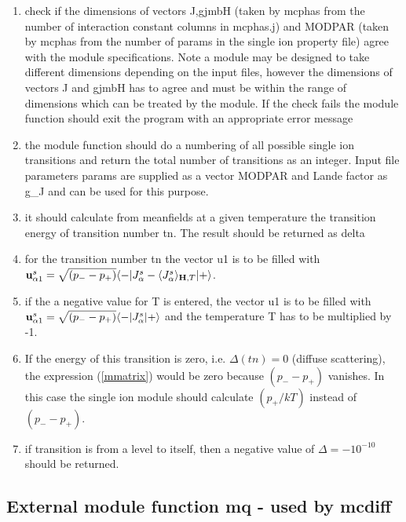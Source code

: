 \begin{enumerate}
\item check if the dimensions of vectors J,gjmbH (taken by {\prg mcphas} from the number of 
interaction constant columns in {\prg mcphas.j})
 and MODPAR (taken by {\prg mcphas} from the number of params in the single ion property
file) agree with the module specifications. Note a module may be designed to 
take different dimensions depending on the input files, however the dimensions
of vectors J and gjmbH has to agree and must be within the range of dimensions which
can be treated by the module. If the check fails the module function should exit the
program with an appropriate error message
\item the module function should do a numbering of all possible single ion transitions and return
the total number of transitions as an integer. Input file parameters params are supplied as a vector MODPAR and
Lande factor as g\_J and  can be used for this purpose.
\item it should calculate from meanfields at a given temperature the 
transition energy of transition number {\prg tn}. The result should be returned as {\prg delta}
\item for the transition number tn the vector u1 is to be filled with ${\mathbf u^s_{\alpha1}}=\sqrt{(p_--p_+)}\langle -|J^s_{\alpha}-\langle J^s_{\alpha}\rangle_{\mathbf H,T}|+\rangle$.
\item if the a negative value for T is entered, the vector u1 is to be filled with
        ${\mathbf u^s_{\alpha1}}=\sqrt{(p_--p_+)}\langle -|J^s_{\alpha}|+\rangle$ and the 
       temperature T has to be multiplied by -1.
\item
If the energy of this transition
is zero, i.e. $\Delta(tn)=0$ (diffuse scattering), 
the expression (\ref{mmatrix}) would be zero because $(p_--p_+)$ vanishes.
In this case the single ion module should calculate $(p_+/kT)$ instead of $(p_--p_+)$.
\item if transition is from a level to itself, then a negative value of $\Delta=-10^{-10}$ should be returned.
\end{enumerate}

\subsection{External module function {\prg mq} - used by {\prg mcdiff}  }

